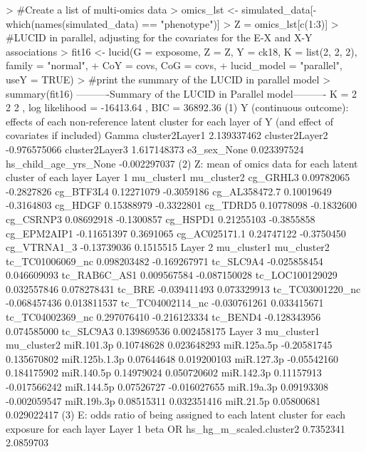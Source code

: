 \begin{example}
> #Create a list of multi-omics data
> omics_lst <- simulated_data[-which(names(simulated_data) == "phenotype")]
> Z = omics_lst[c(1:3)]  
> #LUCID in parallel, adjusting for the covariates for the E-X and X-Y associations
> fit16 <- lucid(G = exposome, Z = Z, Y = ck18, K = list(2, 2, 2), family = "normal", 
+                CoY = covs, CoG = covs,
+                lucid_model = "parallel", useY = TRUE)
> #print the summary of the LUCID in parallel model      
> summary(fit16)
----------Summary of the LUCID in Parallel model---------- 
K =  2 2 2 , log likelihood = -16413.64 , BIC =  36892.36 
(1) Y (continuous outcome): effects of each non-reference latent cluster 
    for each layer of Y 
(and effect of covariates if included) 
                             Gamma
cluster2Layer1         2.139337462
cluster2Layer2        -0.976575066
cluster2Layer3         1.617148373
e3_sex_None            0.023397524
hs_child_age_yrs_None -0.002297037
(2) Z: mean of omics data for each latent cluster of each layer 
Layer  1 
              mu_cluster1 mu_cluster2
cg_GRHL3       0.09782065  -0.2827826
cg_BTF3L4      0.12271079  -0.3059186
cg_AL358472.7  0.10019649  -0.3164803
cg_HDGF        0.15388979  -0.3322801
cg_TDRD5       0.10778098  -0.1832600
cg_CSRNP3      0.08692918  -0.1300857
cg_HSPD1       0.21255103  -0.3855858
cg_EPM2AIP1   -0.11651397   0.3691065
cg_AC025171.1  0.24747122  -0.3750450
cg_VTRNA1_3   -0.13739036   0.1515515
Layer  2 
                  mu_cluster1  mu_cluster2
tc_TC01006069_nc  0.098203482 -0.169267971
tc_SLC9A4        -0.025858454  0.046609093
tc_RAB6C_AS1      0.009567584 -0.087150028
tc_LOC100129029   0.032557846  0.078278431
tc_BRE           -0.039411493  0.073329913
tc_TC03001220_nc -0.068457436  0.013811537
tc_TC04002114_nc -0.030761261  0.033415671
tc_TC04002369_nc  0.297076410 -0.216123334
tc_BEND4         -0.128343956  0.074585000
tc_SLC9A3         0.139869536  0.002458175
Layer  3 
              mu_cluster1  mu_cluster2
miR.101.3p     0.10748628  0.023648293
miR.125a.5p   -0.20581745  0.135670802
miR.125b.1.3p  0.07644648  0.019200103
miR.127.3p    -0.05542160  0.184175902
miR.140.5p     0.14979024  0.050720602
miR.142.3p     0.11157913 -0.017566242
miR.144.5p     0.07526727 -0.016027655
miR.19a.3p     0.09193308 -0.002059547
miR.19b.3p     0.08515311  0.032351416
miR.21.5p      0.05800681  0.029022417
(3) E: odds ratio of being assigned to each latent cluster for each exposure 
    for each layer 
Layer  1 
                                     beta        OR
hs_hg_m_scaled.cluster2         0.7352341 2.0859703

\end{example}
